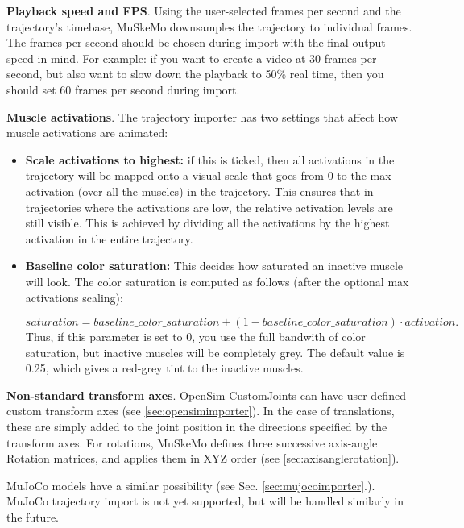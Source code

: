 \documentclass{article}
\begin{document}
\textbf{Playback speed and FPS}. Using the user-selected frames per second and the trajectory's timebase, MuSkeMo downsamples the trajectory to individual frames. The frames per second should be chosen during import with the final output speed in mind. For example: if you want to create a video at 30 frames per second, but also want to slow down the playback to 50\% real time, then you should set 60 frames per second during import.


\textbf{Muscle activations}. The trajectory importer has two settings that affect how muscle activations are animated:

\begin{itemize}
 \item \textbf{Scale activations to highest:} if this is ticked, then all activations in the trajectory will be mapped onto a visual scale that goes from 0 to the max activation (over all the muscles) in the trajectory. This ensures that in trajectories where the activations are low, the relative activation levels are still visible. This is achieved by dividing all the activations by the highest activation in the entire trajectory.
\item \textbf{Baseline color saturation:} This decides how saturated an inactive muscle will look. The color saturation is computed as follows (after the optional max activations scaling):

\begin{equation}
saturation = baseline\_color\_saturation + (1 - baseline\_color\_saturation) \cdot activation.
\end{equation}
Thus, if this parameter is set to 0, you use the full bandwith of color saturation, but inactive muscles will be completely grey. The default value is 0.25, which gives a red-grey tint to the inactive muscles.
\end{itemize}


\textbf{Non-standard transform axes}.
OpenSim CustomJoints can have user-defined custom transform axes (see \ref{sec:opensimimporter}). In the case of translations, these are simply added to the joint position in the directions specified by the transform axes. For rotations, MuSkeMo defines three successive axis-angle Rotation matrices, and applies them in XYZ order (see \ref{sec:axisanglerotation}).

MuJoCo models have a similar possibility (see Sec. \ref{sec:mujocoimporter}.). MuJoCo trajectory import is not yet supported, but will be handled similarly in the future.
\end{document}
